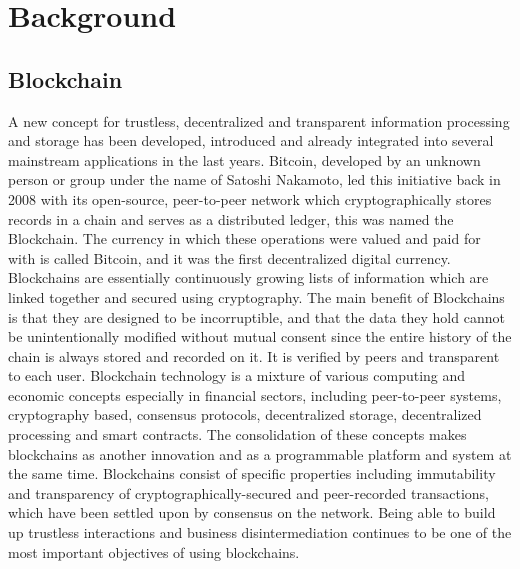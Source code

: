 \section{Background}

\subsection{Blockchain}

A new concept for trustless, decentralized and transparent information processing and storage has been developed, introduced and already integrated into several mainstream applications in the last years. Bitcoin, developed by an unknown person or group under the name of Satoshi Nakamoto\cite{nakamoto2008bitcoin}, led this initiative back in 2008 with its open-source, peer-to-peer network which cryptographically stores records in a chain and serves as a distributed ledger, this was named the Blockchain. The currency in which these operations were valued and paid for with is called Bitcoin, and it was the first decentralized digital currency.
Blockchains are essentially continuously growing lists of information which are linked together and secured using cryptography. The main benefit of Blockchains is that they are designed to be incorruptible, and that the data they hold cannot be unintentionally modified without mutual consent since the entire history of the chain is always stored and recorded on it. It is verified by peers and transparent to each user.
Blockchain technology is a mixture of various computing and economic concepts especially in financial sectors, including peer-to-peer systems, cryptography based, consensus protocols, decentralized storage, decentralized processing and smart contracts. The consolidation of these concepts makes blockchains as another innovation and as a programmable platform and system at the same time. Blockchains consist of specific properties including immutability and transparency of cryptographically-secured and peer-recorded transactions, which have been settled upon by consensus on the network. Being able to build up trustless interactions and business disintermediation continues to be one of the most important objectives of using blockchains.

